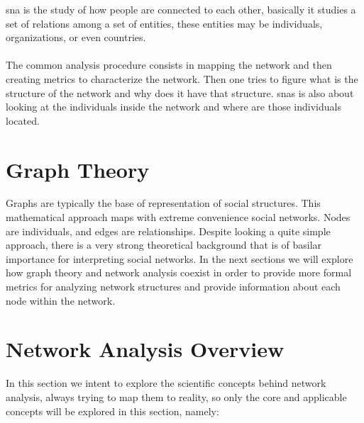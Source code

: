 \acrfull{sna} is the study of how people are connected to each other, basically it studies a set of relations among a set of entities,
these entities may be individuals, organizations, or even countries.\\\\
\indent The common analysis procedure consists in mapping the network and then creating metrics to
characterize the network. Then one tries to figure what is the structure of the network and why does
it have that structure. \glspl{sna} is also about looking at the individuals inside the network and where are those individuals located.

\section{Graph Theory}
Graphs are typically the base of representation of social structures. This mathematical approach maps with  extreme convenience social networks. Nodes are individuals, and edges are relationships. Despite looking a quite simple approach, there is a very strong theoretical background that is of basilar importance for interpreting social networks. In the next sections we will explore how graph theory and network analysis coexist in order to provide more formal metrics for analyzing network structures and provide information about each node within the network.

\section{Network Analysis Overview}
In this section we intent to explore the scientific concepts behind network analysis, always trying to map them to reality, so only the core
and applicable concepts will be explored in this section, namely:

